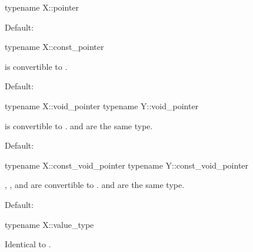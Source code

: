 \begin{itemdecl}
typename X::pointer
\end{itemdecl}

\begin{itemdescr}
\pnum
\remarks
Default: 
\end{itemdescr}

\begin{itemdecl}
typename X::const_pointer
\end{itemdecl}

\begin{itemdescr}
\pnum
\mandates
{} is convertible to .

\pnum
\remarks
Default: 
\end{itemdescr}

\begin{itemdecl}
typename X::void_pointer
typename Y::void_pointer
\end{itemdecl}

\begin{itemdescr}
\pnum
\mandates
{} is convertible to .
 and  are the same type.

\pnum
\remarks
Default:
\end{itemdescr}

\begin{itemdecl}
typename X::const_void_pointer
typename Y::const_void_pointer
\end{itemdecl}

\begin{itemdescr}
\pnum
\mandates
{}, , and 
are convertible to .
 and 
are the same type.

\pnum
\remarks
Default:
\end{itemdescr}

\begin{itemdecl}
typename X::value_type
\end{itemdecl}

\begin{itemdescr}
\pnum
\result
Identical to .
\end{itemdescr}

